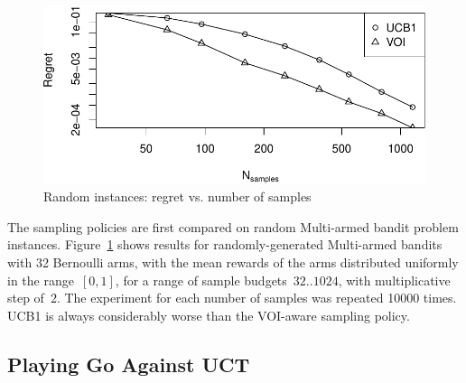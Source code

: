 \documentclass[]{article}
\begin{document}
\begin{figure}[h!]
\centering
\includegraphics[scale=0.6]{flat.pdf}
\caption{Random instances: regret vs. number of samples}
\label{fig:random-instances}
\end{figure}

The sampling policies are first compared on random Multi-armed bandit 
problem instances. Figure~\ref{fig:random-instances} shows results for
randomly-generated Multi-armed bandits with 32 Bernoulli arms, with
the mean rewards of the arms distributed uniformly in the range~$[0,
  1]$, for a range of sample budgets~$32..1024$, with multiplicative
step of~$2$. The experiment for each number of samples was repeated
10000 times. UCB1 is always considerably worse than the
VOI-aware sampling policy.

\subsection{Playing Go Against UCT}
\label{sec:emp-go}
\end{document}
